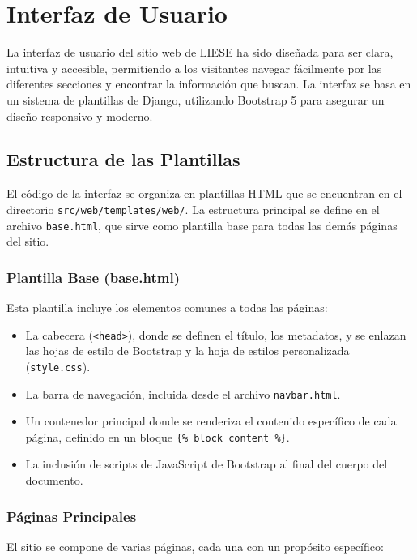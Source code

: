 \chapter{Interfaz de Usuario}
\label{ch:interfaz_usuario}

La interfaz de usuario del sitio web de LIESE ha sido diseñada para ser clara, intuitiva y accesible, permitiendo a los visitantes navegar fácilmente por las diferentes secciones y encontrar la información que buscan. La interfaz se basa en un sistema de plantillas de Django, utilizando Bootstrap 5 para asegurar un diseño responsivo y moderno.

\section{Estructura de las Plantillas}

El código de la interfaz se organiza en plantillas HTML que se encuentran en el directorio \texttt{src/web/templates/web/}. La estructura principal se define en el archivo \texttt{base.html}, que sirve como plantilla base para todas las demás páginas del sitio.

\subsection{Plantilla Base (base.html)}

Esta plantilla incluye los elementos comunes a todas las páginas:
\begin{itemize}
    \item La cabecera (\texttt{<head>}), donde se definen el título, los metadatos, y se enlazan las hojas de estilo de Bootstrap y la hoja de estilos personalizada (\texttt{style.css}).
    \item La barra de navegación, incluida desde el archivo \texttt{navbar.html}.
    \item Un contenedor principal donde se renderiza el contenido específico de cada página, definido en un bloque \texttt{\{\% block content \%\}}.
    \item La inclusión de scripts de JavaScript de Bootstrap al final del cuerpo del documento.
\end{itemize}

\subsection{Páginas Principales}

El sitio se compone de varias páginas, cada una con un propósito específico:

